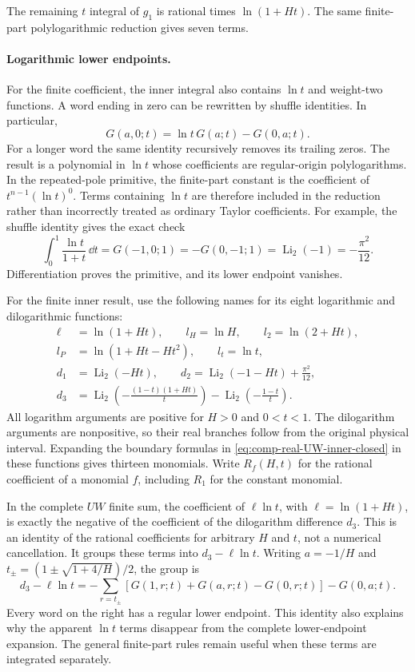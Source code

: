 The remaining $t$ integral of $g_1$ is rational times $\ln(1+Ht)$.
The same finite-part polylogarithmic reduction gives seven terms.
\paragraph{Logarithmic lower endpoints.}
For the finite coefficient, the inner integral also contains $\ln t$
and weight-two functions. A word ending in zero can be rewritten by
shuffle identities. In particular,
\begin{equation}
 G(a,0;t)=\ln t\,G(a;t)-G(0,a;t).
\end{equation}
For a longer word the same identity recursively removes its trailing
zeros. The result is a polynomial in $\ln t$ whose coefficients are
regular-origin polylogarithms. In the repeated-pole primitive, the
finite-part constant is the coefficient of $t^{n-1}(\ln t)^0$.
Terms containing $\ln t$ are therefore included in the reduction rather
than incorrectly treated as ordinary Taylor coefficients.
For example, the shuffle identity gives the exact check
\begin{equation}
 \int_0^1\frac{\ln t}{1+t}\,\dd t
 =G(-1,0;1)=-G(0,-1;1)=\operatorname{Li}_2(-1)
 =-\frac{\pi^2}{12}.
\end{equation}
Differentiation proves the primitive, and its lower endpoint vanishes.

For the finite inner result, use the following names for its eight
logarithmic and dilogarithmic functions:
\begin{align}
 \ell&=\ln(1+Ht),\qquad l_H=\ln H,\qquad
 l_2=\ln(2+Ht),\\
 l_P&=\ln(1+Ht-Ht^2),\qquad l_t=\ln t,\\
 d_1&=\operatorname{Li}_2(-Ht),\qquad
 d_2=\operatorname{Li}_2(-1-Ht)+\frac{\pi^2}{12},\\
 d_3&=\operatorname{Li}_2\!\left(-\frac{(1-t)(1+Ht)}t\right)
       -\operatorname{Li}_2\!\left(-\frac{1-t}t\right).
\end{align}
All logarithm arguments are positive for $H>0$ and $0<t<1$.
The dilogarithm arguments are nonpositive, so their real branches
follow from the original physical interval. Expanding the boundary
formulas in \eqref{eq:comp-real-UW-inner-closed} in these functions
gives thirteen monomials. Write $R_f(H,t)$ for the rational coefficient
of a monomial $f$, including $R_1$ for the constant monomial.

In the complete $UW$ finite sum, the coefficient of
$\ell\ln t$, with $\ell=\ln(1+Ht)$, is exactly the negative of the
coefficient of the dilogarithm difference $d_3$.
This is an identity of the rational coefficients for arbitrary $H$ and
$t$, not a numerical cancellation. It groups these terms into
$d_3-\ell\ln t$. Writing $a=-1/H$ and
$t_\pm=(1\pm\sqrt{1+4/H})/2$, the group is
\begin{equation}
 d_3-\ell\ln t
 =-\sum_{r=t_\pm}\left[G(1,r;t)+G(a,r;t)-G(0,r;t)\right]
 -G(0,a;t).
\end{equation}
Every word on the right has a regular lower endpoint. This identity
also explains why the apparent $\ln t$ terms disappear from the
complete lower-endpoint expansion. The general finite-part rules remain
useful when these terms are integrated separately.

